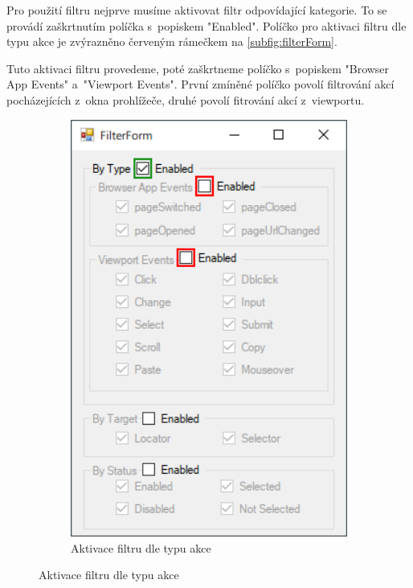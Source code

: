 \documentclass[12pt, a4paper, twoside]{article}
\begin{document}
	Pro použití filtru nejprve musíme aktivovat filtr odpovídající kategorie. To se provádí zaškrtnutím políčka s~popiskem "Enabled". Políčko pro aktivaci filtru dle typu akce je zvýrazněno červeným rámečkem na \cref{subfig:filterForm}.
	
	Tuto aktivaci filtru provedeme, poté zaškrtneme políčko s~popiskem "Browser App Events" a~"Viewport Events". První zmíněné políčko povolí filtrování akcí pocházejících z~okna prohlížeče, druhé povolí fitrování akcí z~viewportu. 
	\begin{figure}[H]
		\centering
		\begin{minipage}{0.47\textwidth}
			\begin{subfigure}[t]{1.0\textwidth}
				\includegraphics[width=1.0\textwidth]{filterForm2.png}
				\caption{Aktivace filtru dle typu akce}

\end{subfigure}
\end{minipage}
\end{figure}
\end{document}
